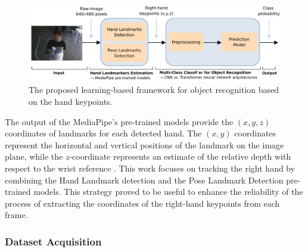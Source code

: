 \begin{figure}[ht]
    \centering
    \includegraphics[width=1\columnwidth]{figs/LearningFrameworkB.pdf}
    \caption{The proposed learning-based framework for object recognition based on the hand keypoints.}
    \label{fig:LearningFramework}
\end{figure}

The output of the MediaPipe's pre-trained models provide the $(x,y,z)$ coordinates of landmarks for each detected hand. The $(x,y)$ coordinates represent the horizontal and vertical positions of the landmark on the image plane, while the $z$-coordinate represents an estimate of the relative depth with respect to the wrist reference \cite{Amprimo2023}. This work focuses on tracking the right hand by combining the Hand Landmark detection and the Pose Landmark Detection pre-trained models. This strategy proved to be useful to enhance the reliability of the process of extracting the coordinates of the right-hand keypoints from each frame.


\subsubsection{Dataset Acquisition}
\label{section:data_representation}

